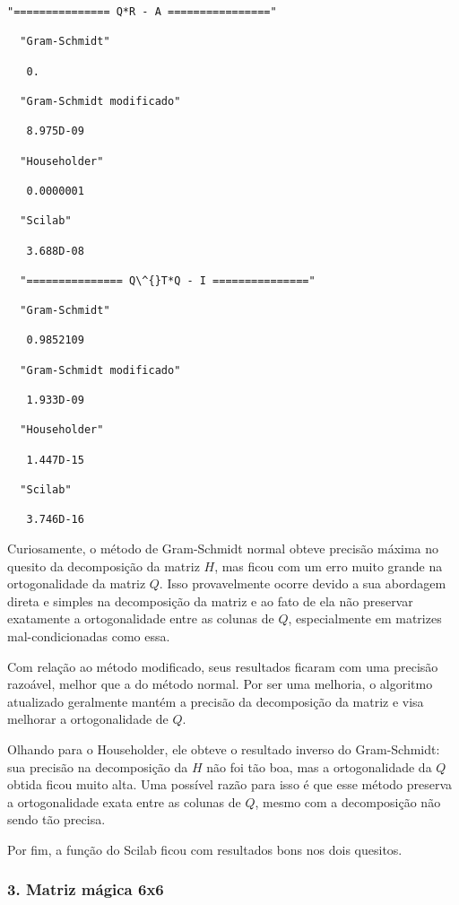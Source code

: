 \documentclass[11pt]{article}
\begin{document}
    \begin{Verbatim}[commandchars=\\\{\}]
  "=============== Q*R - A ================"

  "Gram-Schmidt"

   0.

  "Gram-Schmidt modificado"

   8.975D-09

  "Householder"

   0.0000001

  "Scilab"

   3.688D-08

  "=============== Q\^{}T*Q - I ==============="

  "Gram-Schmidt"

   0.9852109

  "Gram-Schmidt modificado"

   1.933D-09

  "Householder"

   1.447D-15

  "Scilab"

   3.746D-16
    \end{Verbatim}

    Curiosamente, o método de Gram-Schmidt normal obteve precisão máxima no
quesito da decomposição da matriz \(H\), mas ficou com um erro muito
grande na ortogonalidade da matriz \(Q\). Isso provavelmente ocorre
devido a sua abordagem direta e simples na decomposição da matriz e ao
fato de ela não preservar exatamente a ortogonalidade entre as colunas
de \(Q\), especialmente em matrizes mal-condicionadas como essa.

Com relação ao método modificado, seus resultados ficaram com uma
precisão razoável, melhor que a do método normal. Por ser uma melhoria,
o algoritmo atualizado geralmente mantém a precisão da decomposição da
matriz e visa melhorar a ortogonalidade de \(Q\).

Olhando para o Householder, ele obteve o resultado inverso do
Gram-Schmidt: sua precisão na decomposição da \(H\) não foi tão boa, mas
a ortogonalidade da \(Q\) obtida ficou muito alta. Uma possível razão
para isso é que esse método preserva a ortogonalidade exata entre as
colunas de \(Q\), mesmo com a decomposição não sendo tão precisa.

Por fim, a função do Scilab ficou com resultados bons nos dois quesitos.

\hypertarget{matriz-muxe1gica-6x6}{%
\subsubsection{3. Matriz mágica 6x6}\label{matriz-muxe1gica-6x6}}
\end{document}
